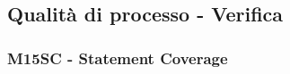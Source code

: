 \subsection{Qualità di processo - Verifica}

\vspace{0.3cm}

\subsubsection{M15SC - Statement Coverage}

